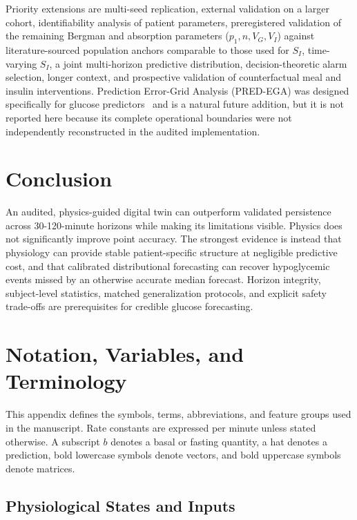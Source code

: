 \documentclass[journal]{IEEEtran}
\begin{document}
Priority extensions are multi-seed replication, external validation on a larger cohort, identifiability analysis of patient parameters, preregistered validation of the remaining Bergman and absorption parameters ($p_1, n, V_G, V_I$) against literature-sourced population anchors comparable to those used for $S_I$, time-varying $S_I$, a joint multi-horizon predictive distribution, decision-theoretic alarm selection, longer context, and prospective validation of counterfactual meal and insulin interventions. Prediction Error-Grid Analysis (PRED-EGA) was designed specifically for glucose predictors~\cite{ref53} and is a natural future addition, but it is not reported here because its complete operational boundaries were not independently reconstructed in the audited implementation.

\section{Conclusion}

An audited, physics-guided digital twin can outperform validated persistence across 30-120-minute horizons while making its limitations visible. Physics does not significantly improve point accuracy. The strongest evidence is instead that physiology can provide stable patient-specific structure at negligible predictive cost, and that calibrated distributional forecasting can recover hypoglycemic events missed by an otherwise accurate median forecast. Horizon integrity, subject-level statistics, matched generalization protocols, and explicit safety trade-offs are prerequisites for credible glucose forecasting.

\appendices
\section{Notation, Variables, and Terminology}

This appendix defines the symbols, terms, abbreviations, and feature groups used in the manuscript. Rate constants are expressed per minute unless stated otherwise. A subscript $b$ denotes a basal or fasting quantity, a hat denotes a prediction, bold lowercase symbols denote vectors, and bold uppercase symbols denote matrices.

\subsection{Physiological States and Inputs}
\end{document}
